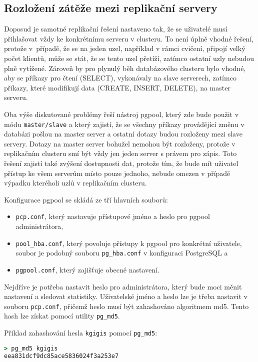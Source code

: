 \subsection{Rozložení zátěže mezi replikační servery}
\label{kRozlozeni}

Doposud je samotné replikační řešení nastaveno tak, že se uživatelé musí
přihlašovat vždy ke konkrétnímu serveru v clusteru. To není úplně vhodné řešení,
protože v~případě, že se na jeden uzel, například v rámci cvičení, připojí velký
počet klientů, může se stát, že se tento uzel přetíží, zatímco ostatní uzly
nebudou plně vytížené. Zároveň by pro plynulý běh databázového clusteru bylo
vhodné, aby se příkazy pro čtení (SELECT), vykonávaly na slave serverech,
zatímco příkazy, které modifikují data (CREATE, INSERT, DELETE), na master
serveru.

Oba výše diskutované problémy řeší nástroj pgpool, který zde bude
použit v módu \texttt{master/slave} a který zajistí, že se všechny příkazy
provádějící změnu v databázi pošlou na master server a ostatní dotazy budou
rozloženy mezi slave servery. Dotazy na master server bohužel nemohou být
rozloženy, protože v replikačním clusteru smí být vždy jen jeden server s právem
pro zápis. Toto řešení zajistí také zvýšení dostupnosti dat, protože tím, že
bude mít uživatel přístup ke všem serverům místo pouze jednoho, nebude omezen v
případě výpadku kteréholi uzlů v replikačním clusteru.

Konfigurace pgpool se skládá ze tří hlavních souborů:
\begin{itemize}
  \item \texttt{pcp.conf}, který nastavuje přístupové jméno a heslo pro
    pgpool administrátora,
  \item \texttt{pool\_hba.conf}, který povoluje přístupy k pgpool pro
    konkrétní uživatele, soubor je podobný souboru \texttt{pg\_hba.conf} v
    konfiguraci PostgreSQL a
  \item \texttt{pgpool.conf}, který zajišťuje obecné nastavení.
\end{itemize}

Nejdříve je potřeba nastavit heslo pro administrátora, který bude moci měnit
nastavení a sledovat statistiky. Uživatelské jméno a heslo lze je třeba nastavit
v souboru \texttt{pcp.conf}, přičemž heslo musí být zahashováno algoritmem md5.
Tento hash lze získat pomocí utility \texttt{pg\_md5}.

Příklad zahashování hesla \texttt{kgigis} pomocí \texttt{pg\_md5}:
\begin{lstlisting}[language=ruby,morekeywords={pg_md5}]
> pg_md5 kgigis
eea831dcf9dc85ace5836024f3a253e7
\end{lstlisting}

